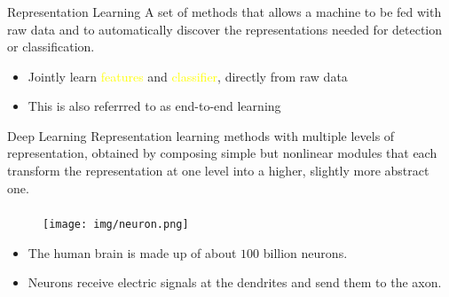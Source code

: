 \documentclass[UTF8,11pt,colorlinks,compress,openany]{beamer}%
\begin{document}
\begin{frame}\frametitle{}
\begin{block}{Representation Learning}
A set of methods that allows a machine to be fed with raw data and to automatically discover the representations needed for detection or classification.
\end{block}
\begin{itemize}
	\item Jointly learn \textcolor{yellow}{features} and \textcolor{yellow}{classifier}, directly from raw data
	\item This is also referrred to as end-to-end learning
\end{itemize}
\begin{block}{Deep Learning}
Representation learning methods with multiple levels of representation, obtained by composing simple but nonlinear modules that each transform the representation at one level into a higher, slightly more abstract one.
\end{block}
\end{frame}

\begin{frame}\frametitle{}
\begin{figure}
\texttt{[image: img/neuron.png]}
\end{figure}
\begin{itemize}
	\item The human brain is made up of about $100$ billion neurons.
	\item Neurons receive electric signals at the dendrites and send them to the axon.
\end{itemize}
\end{frame}
\end{document}
